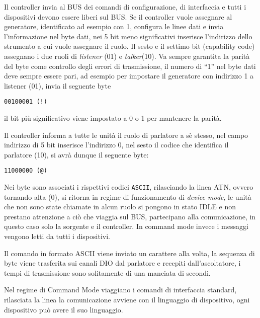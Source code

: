 Il controller invia al BUS dei comandi di configurazione, di interfaccia e
tutti i dispositivi devono essere liberi sul BUS.
Se il controller vuole assegnare al generatore, identificato ad esempio con 1,
configura
le linee dati e invia l'informazione nel byte dati, nei 5 bit meno
significativi inserisce l'indirizzo dello strumento a cui vuole assegnare il
ruolo.
Il sesto e il settimo bit (capability code) assegnano i due ruoli di
\textit{listener} (01) e \textit{talker}(10). Va sempre garantita la parità del
byte come controllo degli errori di trasmissione, il numero di ``1'' nel byte
dati deve sempre
essere pari, ad esempio per impostare il generatore con indirizzo 1 a listener
(01), invia il seguente byte

\verb|00100001 (!)|

il bit più significativo viene impostato a 0 o 1 per mantenere la parità.

Il controller
informa a tutte le unità il ruolo di parlatore a sè stesso, nel campo
indirizzo di 5 bit inserisce l'indirizzo 0, nel sesto il codice che identifica
il parlatore (10), si avrà dunque il seguente byte:

\verb|11000000 (@)|

Nei byte sono associati i rispettivi codici \verb|ASCII|, rilasciando la linea
ATN, ovvero tornando alta (0), si ritorna in regime di funzionamento di
\textit{device
mode}, le unità che non sono state chiamate in alcun ruolo si pongono in stato
IDLE e non prestano attenzione a ciò che viaggia sul BUS, partecipano alla
comunicazione, in questo caso solo la sorgente e il controller.
In command mode invece i messaggi vengono letti da tutti i dispositivi.

Il comando in formato ASCII viene inviato un carattere alla volta, la sequenza
di byte viene trasferita sui canali DIO dal parlatore e recepiti
dall'ascoltatore, i tempi di trasmissione sono solitamente di una manciata di
secondi.

Nel regime di Command Mode viaggiano i comandi di interfaccia standard,
rilasciata la linea la comunicazione avviene con il linguaggio di dispositivo,
ogni dispositivo può avere il suo linguaggio.
